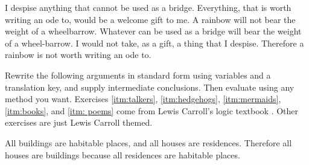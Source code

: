 {\begin{exercises}



\item \label{itm:rainbow} I despise anything that cannot be used as a bridge. Everything, that is worth writing an ode to, would be a welcome gift to me. A rainbow will not bear the weight of a wheelbarrow.  Whatever can be used as a bridge will bear the weight of a wheel-barrow. I would not take, as a gift, a thing that I despise. Therefore a rainbow is not worth writing an ode to. 

\end{exercises}

\noindent\problempart Rewrite the following arguments in standard form using variables and a translation key, and supply intermediate conclusions. Then evaluate using any method you want. Exercises \ref{itm:talkers}, \ref{itm:hedgehogs}, \ref{itm:mermaids}, \ref{itm:books}, and \ref{itm: poems} come from Lewis Carroll's logic textbook \citep{Dodgson1896}. Other exercises are just Lewis Carroll themed.

\begin{exercises}

\item All buildings are habitable places, and all houses are residences. Therefore all houses are buildings because all residences are habitable places. 


\end{exercises}}
